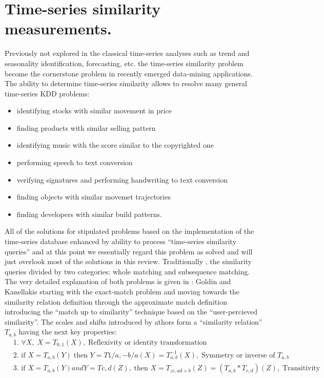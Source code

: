 \chapter{Time-series similarity measurements.}
Previously not explored in the classical time-series analyses such as trend and seasonality identification, forecasting, etc. the time-series similarity problem become the cornerstone problem in recently emerged data-mining applications. The ability to determine time-series similarity allows to resolve many general time-series KDD problems:
\begin{itemize}
	\item identifying stocks with similar movement in price \cite{citeulike:4295242} \cite{citeulike:4031865} \cite{citeulike:4025073}
	\item finding products with similar selling pattern \cite{citeulike:4326324}
	\item identifying music with the score similar to the copyrighted one \cite{citeulike:3821484} \cite{citeulike:3815076}
	\item performing speech to text conversion \cite{citeulike:3728228}
	\item verifying signatures and performing handwriting to text conversion \cite{citeulike:3733947} \cite{citeulike:3513035}
	\item finding objects with similar movemet trajectories \cite{citeulike:964832} \cite{citeulike:3728229} \cite{citeulike:3815864}
	\item finding developers with similar build patterns.
\end{itemize}

All of the solutions for stipulated problems based on the implementation of the time-series database enhanced by ability to process ``time-series similarity queries'' and at this point we essentially regard this problem as solved and will just overlook most of the solutions in this review.  Traditionally \cite{citeulike:3973409}, the similarity queries divided by two categories: whole matching and subsequence matching. The very detailed explanation of both problems is given in \cite{citeulike:3815880}: Goldin and Kanellakis starting with the exact-match problem and moving towards the similarity relation definition through the approximate match definition introducing the ``match up to similarity'' technique based on the ``user-percieved similarity''. The scales and shifts introduced by athors form a ``similarity relation'' $T_{a,b}$ having the next key properties:
\begin{align}
 & \mbox{1. } \forall X, \; X=T_{0,1}(X), \; \mbox{Reflexivity or identity transformation} \\
 & \mbox{2. } \mbox{if } X=T_{a,b}(Y) \; \mbox{then } Y=T{1/a,-b/a}(X) = T^{-1}_{a,b}(X), \; \mbox{Symmetry or inverse of $T_{a,b}$} \\
 & \mbox{3. } \mbox{if } X=T_{a,b}(Y) and Y=T{c,d}(Z), \; \mbox{then } X=T_{zc, ad+b}(Z) = (T_{a,b} * T_{c,d})(Z), \; \mbox{Transitivity}
\end{align}

